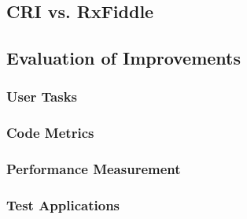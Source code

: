 \subsection{CRI vs. RxFiddle}
	
\subsection{Evaluation of Improvements}
	\subsubsection{User Tasks}
	\subsubsection{Code Metrics}
	\subsubsection{Performance Measurement}
	\subsubsection{Test Applications}
